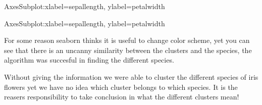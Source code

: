 \documentclass[letterpaper,10pt,english]{jupyterBook}
\begin{document}
\begin{sphinxVerbatim}[commandchars=\\\{\}]
   
\end{sphinxVerbatim}

\begin{sphinxVerbatim}[commandchars=\\\{\}]
\PYGZlt{}AxesSubplot:xlabel=\PYGZsq{}sepal\PYGZus{}length\PYGZsq{}, ylabel=\PYGZsq{}petal\PYGZus{}width\PYGZsq{}\PYGZgt{}
\end{sphinxVerbatim}

\noindent{}

\begin{sphinxVerbatim}[commandchars=\\\{\}]
   
\end{sphinxVerbatim}

\begin{sphinxVerbatim}[commandchars=\\\{\}]
\PYGZlt{}AxesSubplot:xlabel=\PYGZsq{}sepal\PYGZus{}length\PYGZsq{}, ylabel=\PYGZsq{}petal\PYGZus{}width\PYGZsq{}\PYGZgt{}
\end{sphinxVerbatim}

\noindent{}

\sphinxAtStartPar
For some reason seaborn thinks it is useful to change color scheme, yet you can see that there is an uncanny similarity between the clusters and the species, the algorithm was succesful in finding the different species.

\sphinxAtStartPar
Without giving the information we were able to cluster the different species of iris flowers yet we have no idea which cluster belongs to which species.
It is the reasers responsibility to take conclusion in what the different clusters mean!
\end{document}
